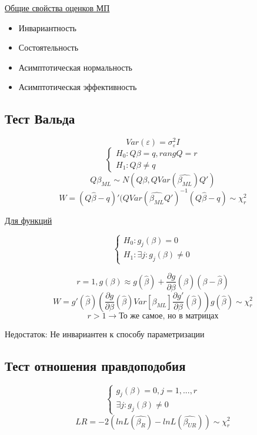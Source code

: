 \documentclass[a4paper, 12pt]{article}
\begin{document}
\underline{Общие свойства оценков МП}
\begin{itemize}
    \item Инвариантность
    \item Состоятельность
    \item Асимптотическая нормальность
    \item Асимптотическая эффективность
\end{itemize}

\subsection{Тест Вальда}

\[Var(\varepsilon) = \sigma^{2}_{\varepsilon}I\]
\[\begin{cases}
    H_{0}: Q\beta = q, rangQ = r \\
    H_{1}: Q\beta \neq q
\end{cases}\]
\[Q\beta_{ML} \sim N(Q\beta, QVar(\hat{\beta_{ML}})Q')\]
\[W = (Q\hat{\beta} - q)'(QVar(\hat{\beta_{ML}}Q')^{-1}(Q\hat{\beta} - q) \sim \chi^{2}_{r}\]

\underline{Для функций}

\[\begin{cases}
    H_{0}: g_{j}(\beta) = 0
    \\
    H_{1}: \exists j: g_{j}(\beta) \neq 0
\end{cases}\]

\[r = 1, g(\beta) \approx g(\hat{\beta}) + \frac{\partial g}{\partial \beta}(\hat{\beta})(\beta - \hat{\beta})\]
\[W = g'(\hat{\beta})\left(\frac{\partial g}{\partial \beta}(\hat{\beta})Var[\hat{\beta_{ML}}]\frac{\partial g'}{\partial \beta}(\hat{\beta})\right)g(\hat{\beta}) \sim \chi^{2}_{r}\]
\[r > 1 \rightarrow \textrm{То же самое, но в матрицах}\]

\begin{center}
    Недостаток: Не инвариантен к способу параметризации
\end{center}

\subsection{Тест отношения правдоподобия}

\[\begin{cases}
    g_{j}(\beta) = 0, j = 1, ..., r
    \\
    \exists j: g_{j}(\beta) \neq 0
\end{cases}\]
\[LR = -2(lnL(\hat{\beta_{R}}) - lnL(\hat{\beta_{UR}})) \sim \chi^{2}_{r}\]
\end{document}
